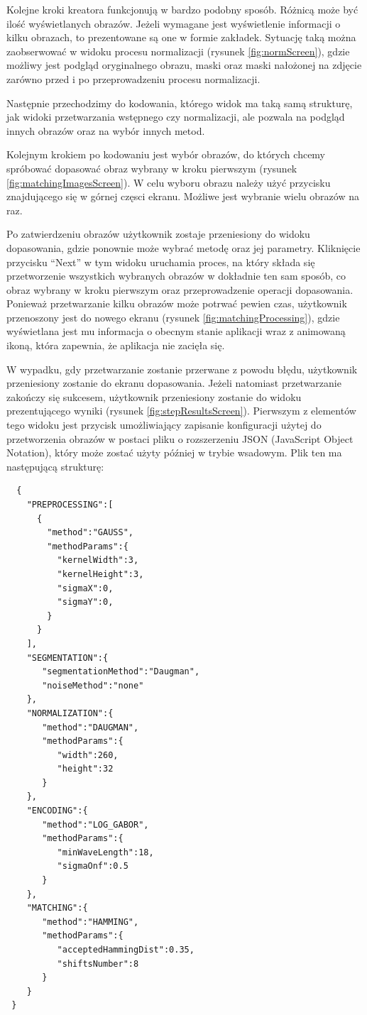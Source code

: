\documentclass[10pt,polish,a4paper,oneside]{ppfcmthesis}
\begin{document}
Kolejne kroki kreatora funkcjonują w bardzo podobny sposób. Różnicą może by\'c iloś\'c wyświetlanych
obrazów. Jeżeli wymagane jest wyświetlenie informacji o kilku obrazach, to prezentowane są one w formie
zakładek. Sytuację taką można zaobserwowa\'c w widoku procesu normalizacji (rysunek \ref{fig:normScreen}),
gdzie możliwy jest podgląd oryginalnego obrazu, maski oraz maski nałożonej na
zdjęcie zarówno przed i po przeprowadzeniu procesu normalizacji.\newline

Następnie przechodzimy do kodowania, którego widok ma taką samą strukturę, jak widoki przetwarzania
wstępnego czy normalizacji, ale pozwala na podgląd innych obrazów oraz na wybór innych metod.\newline

Kolejnym krokiem po kodowaniu jest wybór obrazów, do których chcemy spróbowa\'c dopasowa\'c obraz
wybrany w kroku pierwszym (rysunek \ref{fig:matchingImagesScreen}). W celu wyboru obrazu należy
uży\'c przycisku znajdującego się w górnej częsci ekranu. Możliwe jest wybranie wielu obrazów na raz.\newline

Po zatwierdzeniu obrazów użytkownik zostaje przeniesiony do widoku dopasowania, gdzie ponownie
może wybra\'c metodę oraz jej parametry. Kliknięcie przycisku ``Next'' w tym widoku
uruchamia proces, na który składa się przetworzenie wszystkich wybranych obrazów w dokładnie
ten sam sposób, co obraz wybrany w kroku pierwszym oraz przeprowadzenie operacji dopasowania.
Ponieważ przetwarzanie kilku obrazów może potrwa\'c pewien czas, użytkownik przenoszony jest do
nowego ekranu (rysunek \ref{fig:matchingProcessing}), gdzie wyświetlana jest mu informacja o obecnym
stanie aplikacji wraz z animowaną ikoną, która zapewnia, że aplikacja nie zacięła się.

W wypadku, gdy przetwarzanie zostanie przerwane z powodu błędu, użytkownik przeniesiony zostanie do ekranu
dopasowania. Jeżeli natomiast przetwarzanie zakończy się sukcesem, użytkownik przeniesiony zostanie
do widoku prezentującego wyniki (rysunek \ref{fig:stepResultsScreen}). Pierwszym z elementów tego widoku
jest przycisk umożliwiający zapisanie konfiguracji użytej do przetworzenia obrazów w postaci pliku
o rozszerzeniu JSON (JavaScript Object Notation), który może zosta\'c użyty pó\'zniej w trybie
wsadowym. Plik ten ma następującą strukturę:

\begin{verbatim}
  {
    "PREPROCESSING":[
      {
        "method":"GAUSS",
        "methodParams":{
          "kernelWidth":3,
          "kernelHeight":3,
          "sigmaX":0,
          "sigmaY":0,
        }
      }
    ],
    "SEGMENTATION":{
       "segmentationMethod":"Daugman",
       "noiseMethod":"none"
    },
    "NORMALIZATION":{
       "method":"DAUGMAN",
       "methodParams":{
          "width":260,
          "height":32
       }
    },
    "ENCODING":{
       "method":"LOG_GABOR",
       "methodParams":{
          "minWaveLength":18,
          "sigmaOnf":0.5
       }
    },
    "MATCHING":{
       "method":"HAMMING",
       "methodParams":{
          "acceptedHammingDist":0.35,
          "shiftsNumber":8
       }
    }
 }
\end{verbatim}
\end{document}
